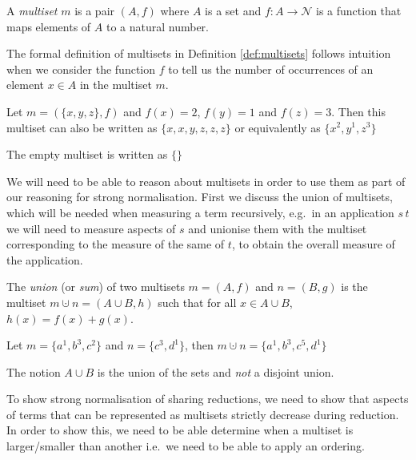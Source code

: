 \documentclass[a4paper,UKenglish,cleveref, autoref]{lipics-v2019}
\newcommand{\set}[1]{ \{ #1 \} }
\newcommand{\app}[2]{#1 \, #2}
\begin{document}
\begin{definition}[Multisets]
\label{def:multisets}
A \emph{multiset} $m$ is a pair $(A, f)$ where $A$ is a set and $f : A \rightarrow \mathcal{N}$ is a function that maps elements of $A$ to a natural number.
\end{definition}

The formal definition of multisets in Definition \ref{def:multisets} follows intuition when we consider the function $f$ to tell us the number of occurrences of an element $x \in A$ in the multiset $m$.

\begin{example}
Let $m = (\set{x, y, z}, f)$ and $f(x) = 2$, $f(y) = 1$ and $f(z) = 3$. Then this multiset can also be written as $\set{x, x, y, z, z, z}$ or equivalently as $\set{x^{2}, y^{1}, z^{3}}$
\end{example}

\begin{remark}
The empty multiset is written as $\set{}$
\end{remark}

We will need to be able to reason about multisets in order to use them as part of our reasoning for strong normalisation. First we discuss the union of multisets, which will be needed when measuring a term recursively, e.g.\ in an application $\app{s}{t}$ we will need to measure aspects of $s$ and unionise them with the multiset corresponding to the measure of the same of $t$, to obtain the overall measure of the application.

\begin{definition} The \emph{union} (or \emph{sum}) of two multisets $m = (A, f)$ and $n = (B, g)$ is the multiset $m \cupdot n = (A \cup B, h)$ such that for all $x \in A \cup B$, $h (x) = f(x) + g(x)$.
\end{definition}

\begin{example}
Let $m = \set{a^{1}, b^{3}, c^{2}}$ and $n = \set{c^{3}, d^{1}}$, then $m \cupdot n = \set{a^{1}, b^{3}, c^{5}, d^{1}}$
\end{example}

\begin{remark}
The notion $A \cup B$ is the union of the sets and \emph{not} a disjoint union.
\end{remark}

To show strong normalisation of sharing reductions, we need to show that aspects of terms that can be represented as multisets strictly decrease during reduction. In order to show this, we need to be able determine when a multiset is larger/smaller than another i.e.\ we need to be able to apply an ordering.
\end{document}
